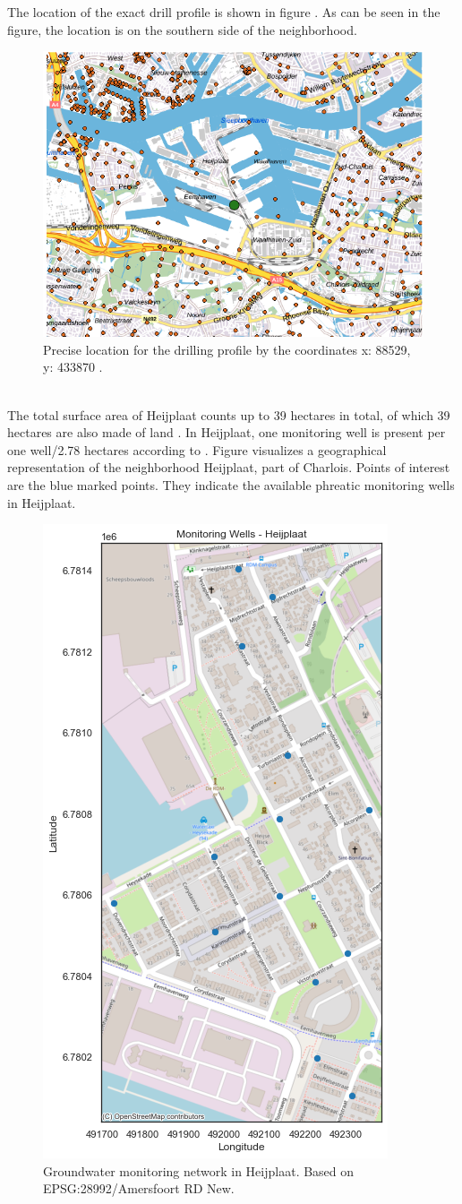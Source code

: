 The location of the exact drill profile is shown in figure . As can be seen in the figure, the location is on the southern side of the neighborhood.
\begin{figure}[htbp]
    \centering
    \includegraphics[width=0.60\linewidth]{figures/heij/boor.png}
    \caption{Precise location for the drilling profile by the coordinates x: 88529, y: 433870 \cite{tno-geologische-dienst-nederland-2023}.}
    \label{drillheij}
\end{figure}\\
\noindent
The total surface area of Heijplaat counts up to 39 hectares in total, of which 39 hectares are also made of land \cite{centraal-bureau-voor-de-statistiek-2020}. In Heijplaat, one monitoring well is present per one well/2.78 hectares according to \cite{centraal-bureau-voor-de-statistiek-2020}. Figure  visualizes a geographical representation of the neighborhood Heijplaat, part of Charlois. Points of interest are the blue marked points. They indicate the available phreatic monitoring wells in Heijplaat. 

\begin{figure}[htbp]
    \centering
    \includegraphics[width=0.60\linewidth]{frontmatter/Heijplaat-fig/Before.png}
    \caption{Groundwater monitoring network in Heijplaat. Based on EPSG:28992/Amersfoort RD New.}
    \label{beforeheij}
\end{figure}
